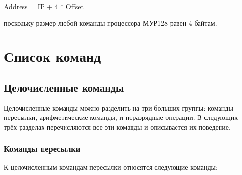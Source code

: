 \documentclass[10pt]{report}
\begin{document}
\parbox{50mm}{%
Address = IP + 4 * Offset}
\vspace{5mm}

\noindent%
поскольку размер любой команды процессора МУР128 равен 4 байтам.
    
\chapter{Список команд}
    \section{Целочисленные команды}
Целочисленные команды можно разделить на три больших группы: команды пересылки, арифметические команды, и поразрядные операции. В следующих трёх разделах перечисляются все эти команды и описывается их поведение.    
        \subsection{Команды пересылки}
К целочисленным командам пересылки относятся следующие команды:
\end{document}
